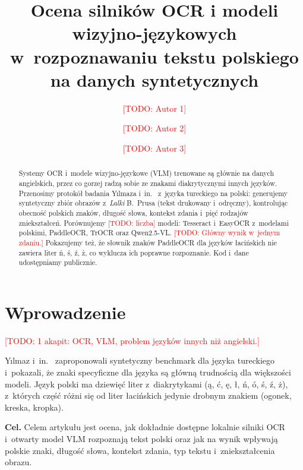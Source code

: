 \documentclass[runningheads]{llncs}
\newcommand{\TODO}[1]{\textcolor{red}{[TODO: #1]}}
\begin{document}
\title{Ocena silników OCR i modeli wizyjno-językowych w~rozpoznawaniu tekstu polskiego na danych syntetycznych}
\author{\TODO{Autor 1} \and \TODO{Autor 2} \and \TODO{Autor 3}}
\authorrunning{\TODO{Autorzy}}
\institute{\TODO{Uczelnia, wydział}\\\email{\TODO{e-mail}}}

\maketitle

\begin{abstract}
Systemy OCR i~modele wizyjno-językowe (VLM) trenowane są głównie na danych angielskich, przez co
gorzej radzą sobie ze znakami diakrytycznymi innych języków. Przenosimy protokół badania
Yılmaza i~in.~\cite{yilmaz2026} z~języka tureckiego na polski: generujemy syntetyczny zbiór obrazów
z~\emph{Lalki} B.~Prusa (tekst drukowany i~odręczny), kontrolując obecność polskich znaków, długość słowa,
kontekst zdania i~pięć rodzajów zniekształceń. Porównujemy \TODO{liczba} modeli: Tesseract i~EasyOCR
z~modelami polskimi, PaddleOCR, TrOCR oraz Qwen2.5-VL. \TODO{Główny wynik w~jednym zdaniu.} Pokazujemy
też, że słownik znaków PaddleOCR dla języków łacińskich nie zawiera liter ń, ś, ź, ż, co wyklucza
ich poprawne rozpoznanie. Kod i~dane udostępniamy publicznie.
\end{abstract}

\section{Wprowadzenie}

\TODO{1 akapit: OCR, VLM, problem języków innych niż angielski.}

Yılmaz i~in.~\cite{yilmaz2026} zaproponowali syntetyczny benchmark dla języka tureckiego i~pokazali,
że znaki specyficzne dla języka są główną trudnością dla większości modeli. Język polski ma
dziewięć liter z~diakrytykami (ą, ć, ę, ł, ń, ó, ś, ź, ż), z~których część różni się od liter
łacińskich jedynie drobnym znakiem (ogonek, kreska, kropka).

\textbf{Cel.} Celem artykułu jest ocena, jak dokładnie dostępne lokalnie silniki OCR i~otwarty model
VLM rozpoznają tekst polski oraz jak na wynik wpływają polskie znaki, długość słowa, kontekst zdania,
typ tekstu i~zniekształcenia obrazu.
\end{document}
